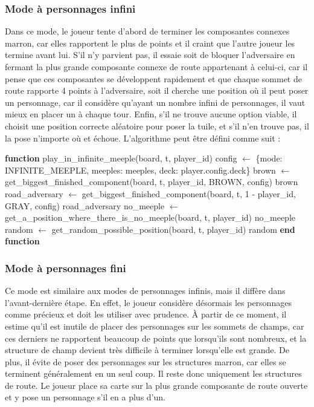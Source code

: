 \documentclass[10pt]{article}
\begin{document}
\subsubsection{Mode à personnages infini}

Dans ce mode, le joueur tente d'abord de terminer les composantes connexes marron, car elles rapportent le plus de points et il craint que l'autre joueur les termine avant lui. S'il n'y parvient pas, il essaie soit de bloquer l'adversaire en fermant la plus grande composante connexe de route appartenant à celui-ci, car il pense que ces composantes se développent rapidement et que chaque sommet de route rapporte 4 points à l'adversaire, soit il cherche une position où il peut poser un personnage, car il considère qu'ayant un nombre infini de personnages, il vaut mieux en placer un à chaque tour. Enfin, s'il ne trouve aucune option viable, il choisit une position correcte aléatoire pour poser la tuile, et s'il n'en trouve pas, il la pose n'importe où et échoue. L'algorithme peut être défini comme suit :

\begin{algorithm}[H]
\caption{play\_in\_infinite\_meeple}
\begin{algorithmic}[1]
\STATE \textbf{function} play\_in\_infinite\_meeple(board, t, player\_id)
    \STATE config $\gets$ \{mode: INFINITE\_MEEPLE, meeples: meeples, deck: player.config.deck\}
    \STATE brown $\gets$ get\_biggest\_finished\_component(board, t, player\_id, BROWN, config)
        \RETURN brown
    \ENDIF
        \STATE road\_adversary $\gets$ get\_biggest\_finished\_component(board, t, 1 - player\_id, GRAY, config)
            \RETURN road\_adversary
        \ENDIF
    \ELSE
        \STATE no\_meeple $\gets$ get\_a\_position\_where\_there\_is\_no\_meeple(board, t, player\_id)
            \RETURN no\_meeple
        \ENDIF
    \ENDIF
    \STATE random $\gets$ get\_random\_possible\_position(board, t, player\_id)
    \RETURN random
\STATE \textbf{end function}
\end{algorithmic}
\end{algorithm}\subsubsection{Mode à personnages fini}

Ce mode est similaire aux modes de personnages infinis, mais il diffère dans l'avant-dernière étape. En effet, le joueur considère désormais les personnages comme précieux et doit les utiliser avec prudence. À partir de ce moment, 
 il estime qu'il est inutile de placer des personnages sur les sommets de champs, car ces derniers ne rapportent beaucoup de points que lorsqu'ils sont nombreux, et la structure de champ devient très difficile à terminer lorsqu'elle est grande. De plus, il évite de poser des personnages sur les structures marron, car elles se terminent généralement en un seul coup. Il reste donc uniquement les structures de route. Le joueur place sa carte sur la plus grande composante de route ouverte et y pose un personnage s'il en a plus d'un.
\end{document}
